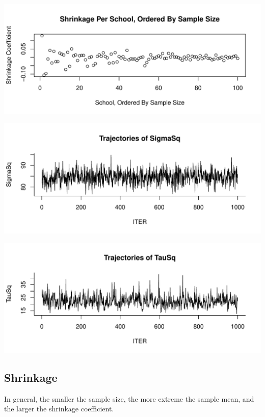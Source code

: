 \documentclass[12pt,letterpaper]{article}\usepackage[]{graphicx}\usepackage[]{color}
\makeatletter
\def\maxwidth{ %
  \ifdim\Gin@nat@width>\linewidth
    \linewidth
  \else
    \Gin@nat@width
  \fi
}
\newenvironment{knitrout}{}{} %
\makeatother
\begin{document}
\begin{knitrout}
\includegraphics[width=\maxwidth]{figure/unnamed-chunk-2-2} 

\includegraphics[width=\maxwidth]{figure/unnamed-chunk-2-3} 

\includegraphics[width=\maxwidth]{figure/unnamed-chunk-2-4} 

\end{knitrout}

\subsection{Shrinkage}

In general, the smaller the sample size, the more extreme the sample mean, and the larger the shrinkage coefficient. 
\end{document}
